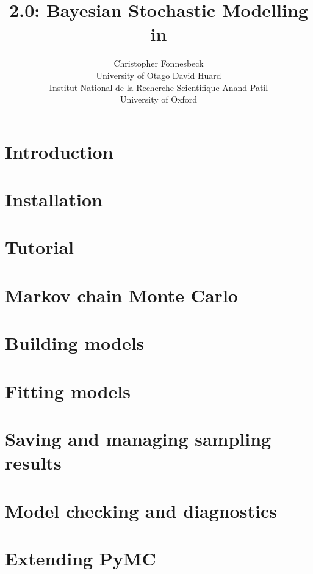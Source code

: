 \documentclass[]{jss}
\author{Christopher Fonnesbeck\\University of Otago \And 
        David Huard\\Institut National de la Recherche Scientiﬁque \And
		Anand Patil\\University of Oxford}
\title{\pkg{PyMC} 2.0: Bayesian Stochastic Modelling in \proglang{Python}}
\begin{document}

\section{Introduction} 
\label{chap:intro} 


\section{Installation} 
\label{chap:install} 


\section{Tutorial}
\label{chap:tutorial}


\section{Markov chain Monte Carlo} 
\label{chap:MCMC} 


\section{Building models}
\label{chap:modelbuilding} 


\section{Fitting models}
\label{chap:modelfitting}


\section{Saving and managing sampling results}
\label{chap:database} 


\section{Model checking and diagnostics} 
\label{chap:modelchecking}


\section{Extending PyMC}
\label{chap:extending}

\end{document}
